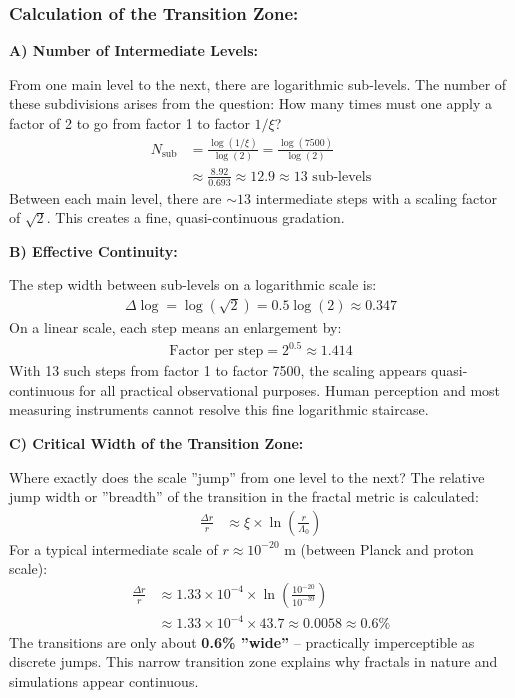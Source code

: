 	\subsubsection*{Calculation of the Transition Zone:}
	
	\textbf{A) Number of Intermediate Levels:}
	
	From one main level to the next, there are logarithmic sub-levels. The number of these subdivisions arises from the question: How many times must one apply a factor of 2 to go from factor 1 to factor $1/\xi$?
	\begin{align*}
		N_{\text{sub}} &= \frac{\log(1/\xi)}{\log(2)} = \frac{\log(7500)}{\log(2)} \\
		&\approx \frac{8.92}{0.693} \approx 12.9 \approx 13 \text{ sub-levels}
	\end{align*}
	Between each main level, there are $\sim 13$ intermediate steps with a scaling factor of $\sqrt{2}$. This creates a fine, quasi-continuous gradation.
	
	\textbf{B) Effective Continuity:}
	
	The step width between sub-levels on a logarithmic scale is:
	\begin{align*}
		\Delta \log = \log(\sqrt{2}) = 0.5 \log(2) \approx 0.347
	\end{align*}
	On a linear scale, each step means an enlargement by:
	\begin{align*}
		\text{Factor per step} = 2^{0.5} \approx 1.414
	\end{align*}
	With 13 such steps from factor 1 to factor 7500, the scaling appears quasi-continuous for all practical observational purposes. Human perception and most measuring instruments cannot resolve this fine logarithmic staircase.
	
	\textbf{C) Critical Width of the Transition Zone:}
	
	Where exactly does the scale ''jump'' from one level to the next? The relative jump width or ''breadth'' of the transition in the fractal metric is calculated:
	\begin{align*}
		\frac{\Delta r}{r} &\approx \xi \times \ln\left(\frac{r}{\Lambda_0}\right)
	\end{align*}
	For a typical intermediate scale of $r \approx 10^{-20}$ m (between Planck and proton scale):
	\begin{align*}
		\frac{\Delta r}{r} &\approx 1.33 \times 10^{-4} \times \ln\left(\frac{10^{-20}}{10^{-39}}\right) \\
		&\approx 1.33 \times 10^{-4} \times 43.7 \approx 0.0058 \approx 0.6\%
	\end{align*}
	The transitions are only about \textbf{0.6\% ''wide''} – practically imperceptible as discrete jumps. This narrow transition zone explains why fractals in nature and simulations appear continuous.
	
